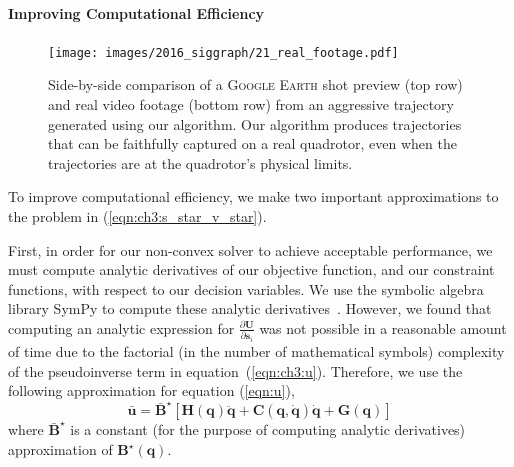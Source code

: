 \paragraph{Improving Computational Efficiency}

\begin{figure}[t]
\centering
\texttt{[image: images/2016\_siggraph/21\_real\_footage.pdf]}
\caption{
Side-by-side comparison of a \textsc{Google Earth} shot preview (top row) and real video footage (bottom row) from an aggressive trajectory generated using our algorithm.
Our algorithm produces trajectories that can be faithfully captured on a real quadrotor, even when the trajectories are at the quadrotor's physical limits.
}
\label{fig:ch3:real}
\end{figure}

To improve computational efficiency, we make two important approximations to the problem in (\ref{eqn:ch3:s_star_v_star}).


First, in order for our non-convex solver to achieve acceptable performance, we must compute analytic derivatives of our objective function, and our constraint functions, with respect to our decision variables.
We use the symbolic algebra library SymPy to compute these analytic derivatives~\cite{sympy:2014}.
However, we found that computing an analytic expression for $\frac{ \partial \mathbf{U} }{ \partial \mathbf{s}_i } $ was not possible in a reasonable amount of time due to the factorial (in the number of mathematical symbols) complexity of the pseudoinverse term  in equation~(\ref{eqn:ch3:u}).
Therefore, we use the following approximation for equation (\ref{eqn:u}),
%
\begin{equation}
\bar{\mathbf{u}} = \bar{\mathbf{B}}^{\star} \left[\mathbf{H}(\mathbf{q}) \ddot{\mathbf{q}} + \mathbf{C}(\mathbf{q},\dot{\mathbf{q}}) \dot{\mathbf{q}} + \mathbf{G}(\mathbf{q})\right]
\label{eqn:ch3:uhat}
\end{equation}
%
where $\bar{\mathbf{B}}^{\star}$ is a constant (for the purpose of computing analytic derivatives) approximation of $\mathbf{B}^{\star}(\mathbf{q})$.

